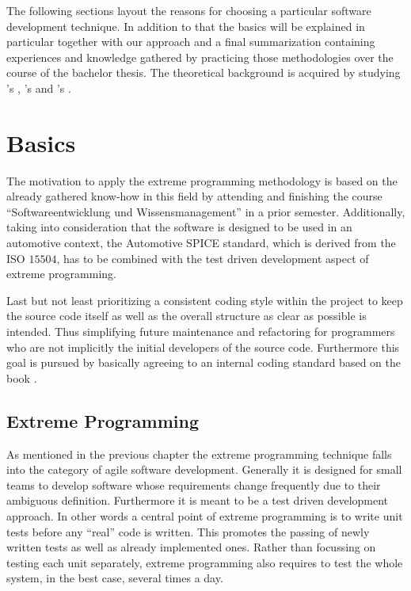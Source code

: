 The following sections layout the reasons for choosing a particular software development technique. 
In addition to that the basics will be explained in particular together with our approach and a final summarization 
containing experiences and knowledge gathered by practicing those methodologies over the course of the bachelor thesis.
The theoretical background is acquired by studying \citeauthor{BECK}'s \cite{BECK}, \citeauthor{CLEANCODE}'s \cite{CLEANCODE} and
\citeauthor{AUTOSPICE}'s \cite{AUTOSPICE}.

\section{Basics}

The motivation to apply the extreme programming methodology is based on the already gathered know-how in this field by attending 
and finishing the course “Softwareentwicklung und Wissensmanagement” in a prior semester. Additionally, taking into consideration 
that the software is designed to be used in an automotive context, the Automotive SPICE\cite{AUTOSPICE} standard, which is derived from the ISO $15504$, 
has to be combined with the test driven development aspect of extreme programming.

Last but not least prioritizing a consistent coding style within the project to keep the source code itself as well as the overall 
structure as clear as possible is intended. Thus simplifying future maintenance and refactoring for programmers who are not implicitly 
the initial developers of the source code. Furthermore this goal is pursued by basically agreeing to an internal coding standard 
based on the book \cite{CLEANCODE}.

\subsection{Extreme Programming}
\label{sec:XP}

As mentioned in the previous chapter the extreme programming\cite{BECK} technique falls into the category of agile software development. Generally it is designed 
for small teams to develop software whose requirements change frequently due to their ambiguous definition. Furthermore it is meant 
to be a test driven development approach. In other words a central point of extreme programming is to write unit tests before any ``real'' 
code is written. This promotes the passing of newly written tests as well as already implemented ones. Rather than 
focussing on testing each unit separately, extreme programming also requires to test the whole system, in the best case, several times a day.

